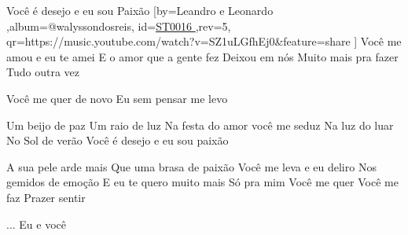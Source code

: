 \beginsong
{Você é desejo e eu sou Paixão %
}[by={Leandro e Leonardo %
},album={@walyssondosreis},
id={\href{https://music.youtube.com/watch?v=SZ1uLGfhEj0&feature=share %
}{ST0016 %
}},rev={5}, %
qr={https://music.youtube.com/watch?v=SZ1uLGfhEj0&feature=share %
}]
\beginverse
Você me amou e eu te amei
E o amor que a gente fez
Deixou em nós
Muito mais pra fazer
Tudo outra vez
\endverse

\beginverse
Você me quer de novo
Eu sem pensar me levo
\endverse

\beginchorus
Um beijo de paz
Um raio de luz
Na festa do amor você me seduz
Na luz do luar
No Sol de verão
Você é desejo e eu sou paixão
\endchorus

\beginverse
A sua pele arde mais
Que uma brasa de paixão
Você me leva e eu deliro
Nos gemidos de emoção
\endverse
{}
\beginverse
E eu te quero muito mais
Só pra mim
Você me quer
Você me faz
Prazer sentir
\endverse
{}

\beginverse
... Eu e você
\endverse


